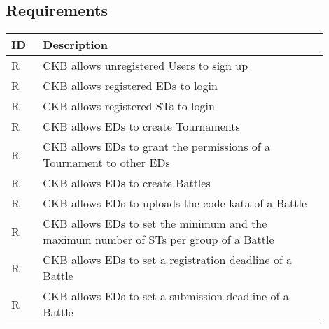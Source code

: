 \subsection{Requirements}
\label{subsec:requirements3}%
\setcounter{req}{1}
\newcommand{\creq}{\thereq\stepcounter{req}}
\begin{center}
    \begin{longtable}{|l|p{0.9\linewidth}|}
        \hline
        \textbf{ID} & \textbf{Description}                                                                                                                             \\
        \hline
        R\creq      & CKB allows unregistered Users to sign up                                                                    \\
        \hline
        R\creq      & CKB allows registered EDs to login                                                                    \\
        \hline
        R\creq      & CKB allows registered STs to login                                                                    \\
        \hline
        R\creq      & CKB allows EDs to create Tournaments                                                                    \\
        \hline
        R\creq      & CKB allows EDs to grant the permissions of a Tournament to other EDs                                                                 \\
        \hline
        R\creq      & CKB allows EDs to create Battles                                                                    \\
        \hline
        R\creq      & CKB allows EDs to uploads the code kata of a Battle                                                                   \\
        \hline
        R\creq      & CKB allows EDs to set the minimum and the maximum number of STs per group of a Battle                                                            \\
        \hline
        R\creq      & CKB allows EDs to set a registration deadline of a Battle                                                                 \\
        \hline
        R\creq      & CKB allows EDs to set a submission deadline of a Battle                                                                \\

\end{longtable}
\end{center}
